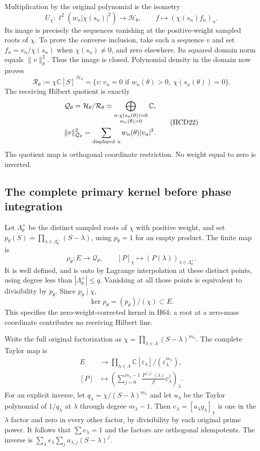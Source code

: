 \documentclass[11pt,a4paper]{article}
\theoremstyle{definition}
\providecommand{\C}{\mathbb C}
\begin{document}
Multiplication by the original polynomial is the isometry
\[
 U_\chi:\ell^2(w_n|\chi(s_n)|^2)\longrightarrow\mathcal H_\theta,
 \qquad f\longmapsto(\chi(s_n)f_n)_n.
 \tag{HCD20}
\]
Its image is precisely the sequences vanishing at the
positive-weight sampled roots of $\chi$. To prove the
converse inclusion, take such a sequence $v$ and set
$f_n=v_n/\chi(s_n)$ when $\chi(s_n)\ne0$, and zero
elsewhere. Its squared domain norm equals $\|v\|_\theta^2$.
Thus the image is closed. Polynomial density in the domain
now proves
\[
 \mathcal R_\theta:=
 \overline{\chi\C[S]}^{\,\mathcal H_\theta}
 =\{v:v_n=0\text{ if }w_n(\theta)>0,\ \chi(s_n(\theta))=0\}.
 \tag{HCD21}
\]
The receiving Hilbert quotient is exactly
\[
 \begin{gathered}
 \mathcal Q_\theta=\mathcal H_\theta/\mathcal R_\theta
 \simeq
 \bigoplus_{\substack{n:\chi(s_n(\theta))=0\\w_n(\theta)>0}}\C,\\
 \|v\|_{\mathcal Q_\theta}^2
 =\sum_{\rm displayed\ n}w_n(\theta)|v_n|^2.
 \end{gathered}
 \tag{HCD22}
\]
The quotient map is orthogonal coordinate restriction.
No weight equal to zero is inverted.

\subsection{The complete primary kernel before phase integration}

Let $\Lambda_\theta^+$ be the distinct sampled roots of
$\chi$ with positive weight, and set
$p_\theta(S)=\prod_{\lambda\in\Lambda_\theta^+}(S-\lambda)$,
using $p_\theta=1$ for an empty product.
The finite map is
\[
 \rho_\theta:E\longrightarrow\mathcal Q_\theta,\qquad
 [P]_\chi\longmapsto(P(\lambda))_{\lambda\in\Lambda_\theta^+}.
 \tag{HCD23}
\]
It is well defined, and is onto by Lagrange interpolation
at these distinct points, using degree less than
$|\Lambda_\theta^+|\le q$. Vanishing at all those points
is equivalent to divisibility by $p_\theta$. Since
$p_\theta\mid\chi$,
\[
 \ker\rho_\theta=(p_\theta)/(\chi)\subset E.
 \tag{HCD24}
\]
This specifies the zero-weight-corrected kernel in H64:
a root at a zero-mass coordinate contributes no receiving
Hilbert line.

Write the full original factorization as
$\chi=\prod_{\lambda\in\Lambda}(S-\lambda)^{m_\lambda}$.
The complete Taylor map is
\[
 \begin{split}
 E&\longrightarrow\prod_{\lambda\in\Lambda}
 \C[\varepsilon_\lambda]/(\varepsilon_\lambda^{m_\lambda}),\\
 [P]&\longmapsto\left(
 \sum_{j=0}^{m_\lambda-1}\frac{P^{(j)}(\lambda)}{j!}
 \varepsilon_\lambda^j\right)_\lambda.
 \end{split}
 \tag{HCD25}
\]
For an explicit inverse, let
$q_\lambda=\chi/(S-\lambda)^{m_\lambda}$ and let
$u_\lambda$ be the Taylor polynomial of $1/q_\lambda$
at $\lambda$ through degree $m_\lambda-1$.
Then $e_\lambda=[u_\lambda q_\lambda]_\chi$ is one
in the $\lambda$ factor and zero in every other factor,
by divisibility by each original prime power. It follows
that $\sum e_\lambda=1$ and the factors are orthogonal
idempotents. The inverse is
$\sum_\lambda e_\lambda\sum_j a_{\lambda,j}(S-\lambda)^j$.
\end{document}

